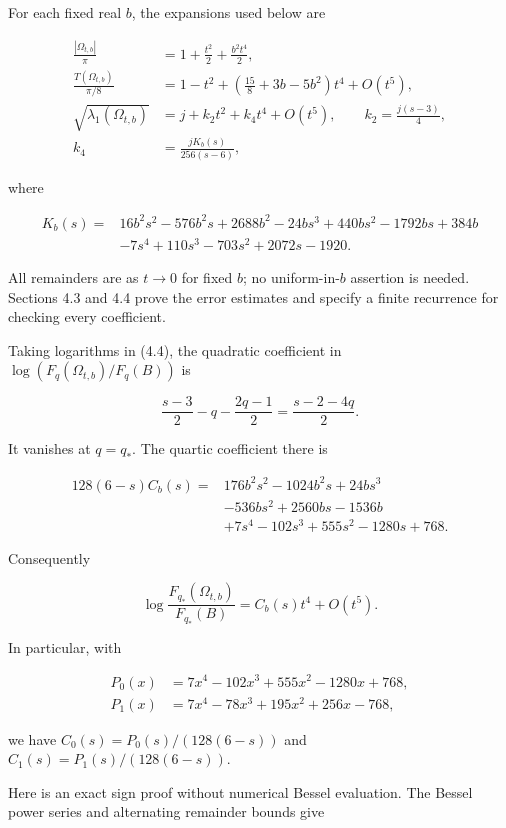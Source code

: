 \documentclass[11pt]{article}
\begin{document}
For each fixed real \(b\), the expansions used below are

\[
\begin{aligned}
\frac{|\Omega_{t,b}|}{\pi}&=1+\frac{t^2}{2}+\frac{b^2t^4}{2},\\
\frac{T(\Omega_{t,b})}{\pi/8}
 &=1-t^2+\left(\frac{15}{8}+3b-5b^2\right)t^4+O(t^5),\\
\sqrt{\lambda_1(\Omega_{t,b})}
 &=j+k_2t^2+k_4t^4+O(t^5),\qquad
k_2=\frac{j(s-3)}4,\\
k_4&=\frac{j K_b(s)}{256(s-6)},
\end{aligned}
\tag{4.4}
\]

where

\[
\begin{aligned}
K_b(s)={}&16b^2s^2-576b^2s+2688b^2
-24bs^3+440bs^2-1792bs+384b\\
&-7s^4+110s^3-703s^2+2072s-1920.
\end{aligned}
\tag{4.5}
\]

All remainders are as \(t\to0\) for fixed \(b\); no uniform-in-\(b\)
assertion is needed. Sections 4.3 and 4.4 prove the error estimates and
specify a finite recurrence for checking every coefficient.

Taking logarithms in (4.4), the quadratic coefficient in
\(\log(F_q(\Omega_{t,b})/F_q(B))\) is

\[
\frac{s-3}{2}-q-\frac{2q-1}{2}=\frac{s-2-4q}{2}.
\tag{4.6}
\]

It vanishes at \(q=q_*\). The quartic coefficient there is

\[
\begin{aligned}
128(6-s)C_b(s)={}&176b^2s^2-1024b^2s+24bs^3\\
&-536bs^2+2560bs-1536b\\
&+7s^4-102s^3+555s^2-1280s+768.
\end{aligned}
\tag{4.7}
\]

Consequently

\[
\log\frac{F_{q_*}(\Omega_{t,b})}{F_{q_*}(B)}
= C_b(s)t^4+O(t^5).
\tag{4.8}
\]

In particular, with

\[
\begin{aligned}
P_0(x)&=7x^4-102x^3+555x^2-1280x+768,\\
P_1(x)&=7x^4-78x^3+195x^2+256x-768,
\end{aligned}
\tag{4.9}
\]

we have \(C_0(s)=P_0(s)/(128(6-s))\) and \(C_1(s)=P_1(s)/(128(6-s))\).

Here is an exact sign proof without numerical Bessel evaluation. The
Bessel power series and alternating remainder bounds give
\end{document}
